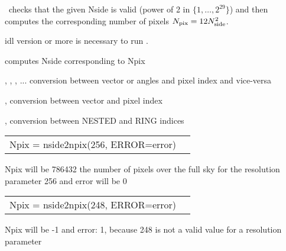 \begin{codedescription}
{\facname\ checks that the given Nside is valid (power of 2 in
$\{1,\ldots,2^{29}\}$) and then computes the
corresponding number of pixels $N_{\mathrm{pix}} = 12N_{\mathrm{side}}^2$.}
\end{codedescription}



\begin{related}
  \begin{sulist}{} %
    \item[idl] version \idlversion or more is necessary to run \facname.	
    \item[\htmlref{npix2nside}{idl:npix2nside}] computes Nside corresponding to Npix
    \item[\htmlref{pix2xxx}{idl:pix_tools}, \htmlref{ang2xxx}{idl:pix_tools}, \htmlref{vec2xxx}{idl:pix_tools}, ... ] conversion between vector or angles and pixel index and vice-versa
    \item[\htmlref{vec2pix}{idl:pix_tools}, \htmlref{pix2vec}{idl:pix_tools}] conversion between vector and pixel index
    \item[\htmlref{nest2ring}{idl:pix_tools}, \htmlref{ring2nest}{idl:pix_tools}] conversion between NESTED and RING indices
  \end{sulist}
\end{related}

\begin{example}
{
\begin{tabular}{ll} %
Npix = nside2npix(256, ERROR=error)
\end{tabular}
}
{
Npix will be 786432 the number of pixels over the full sky for the \healpix
resolution parameter 256 and error will be 0}
\end{example}
\begin{example}
{
\begin{tabular}{ll} %
Npix = nside2npix(248, ERROR=error)
\end{tabular}
}
{
Npix will be -1 and error: 1, because 248 is not a valid value for a \healpix
resolution parameter}
\end{example}


